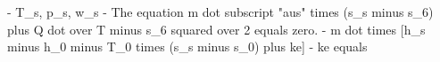 - T_s, p_s, w_s
- The equation m dot subscript "aus" times (s_s minus s_6) plus Q dot over T minus s_6 squared over 2 equals zero.
- m dot times [h_s minus h_0 minus T_0 times (s_s minus s_0) plus ke]
- ke equals
